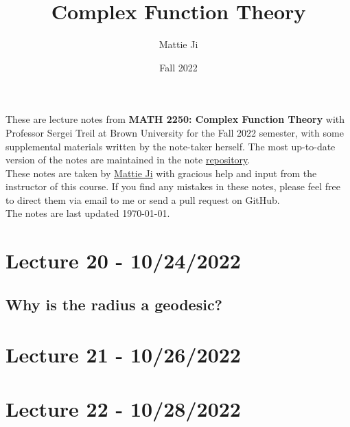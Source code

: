 \documentclass{article}
\title{Complex Function Theory}
\author{Mattie Ji}
\date{Fall 2022}
\begin{document}
\maketitle
These are lecture notes from \textbf{MATH 2250: Complex Function Theory} with Professor Sergei Treil at Brown University for the Fall 2022 semester, with some supplemental materials written by the note-taker herself. The most up-to-date version of the notes are maintained in the note \href{https://github.com/maroon-scorch/MATH2550-notes}{repository}.\\

These notes are taken by \href{https://github.com/maroon-scorch}{Mattie Ji} with gracious help and input from the instructor of this course. If you find any mistakes in these notes, please feel free to direct them via email to me or send a pull request on GitHub.\\

The notes are last updated \today.
\tableofcontents
\newpage





















\section{Lecture 20 - 10/24/2022}

\subsection{Why is the radius a geodesic?}


\section{Lecture 21 - 10/26/2022}

\section{Lecture 22 - 10/28/2022}
\end{document}

